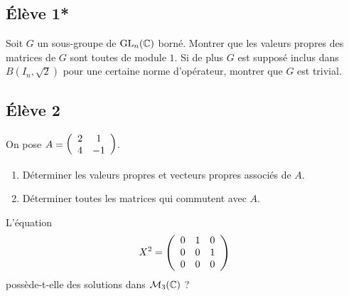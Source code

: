 \documentclass[10pt]{scrartcl}
\title{}
\author{}
\date{}
\begin{document}
    \subsection*{Élève 1*}
    \begin{exo}
        Soit $G$ un sous-groupe de $\operatorname{GL}_n(\operatorname{\mathbb C})$ borné. 
        Montrer que les valeurs propres des matrices de $G$ 
        sont toutes de module $1$. 
        Si de plus $G$ est supposé inclus dans $B(I_n,\sqrt2)$
        pour une certaine norme d'opérateur, montrer que $G$
        est trivial.
    \end{exo}

    \subsection*{Élève 2}
    \begin{ccp}
        On pose $A=\left(\begin{array}{c c} 2 & 1\\ 4 & -1\end{array}\right)$.
        \begin{enumerate}
            \item Déterminer les valeurs propres et vecteurs propres associés de $A$.
            \item Déterminer toutes les matrices qui commutent avec $A$.
        \end{enumerate}
    \end{ccp}

    \begin{exo}
        L'équation 
        \[
            X^2=\left(\begin{array}{c c c} 0 & 1 & 0\\ 0 & 0 & 1\\ 0 & 0 & 0\end{array}\right)
        \]
        possède-t-elle des solutions dans $\mathcal M_3(\operatorname{\mathbb C})$ ? 
    \end{exo}
\end{document}
